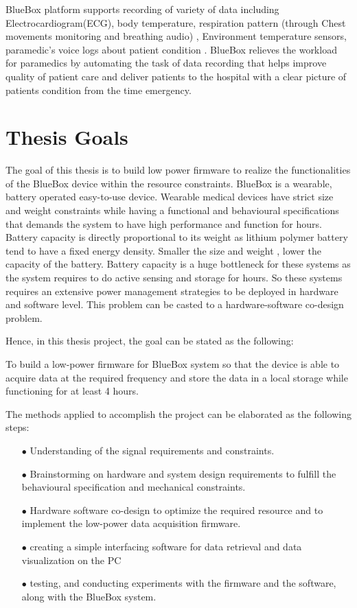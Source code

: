 \hspace{10mm}BlueBox  platform supports recording of variety of data including Electrocardiogram(ECG), body temperature, respiration pattern (through Chest movements monitoring and breathing audio) , Environment temperature sensors, paramedic’s voice logs about patient condition . BlueBox relieves the workload for paramedics by automating the task of data recording that helps improve quality of patient care and deliver patients to the hospital with a clear picture of patients condition from the time emergency. 

\section{Thesis Goals}
\hspace{10mm}The goal of this thesis is to build low power firmware to realize the functionalities of the BlueBox device within the resource constraints. BlueBox is a wearable, battery operated easy-to-use device. Wearable medical devices have strict size and weight constraints while having a functional and behavioural specifications that demands the system to have high performance and function for hours. Battery capacity is directly proportional to its weight as lithium polymer battery tend to have a fixed energy density. Smaller the size and weight , lower the capacity of the battery. Battery capacity is a huge bottleneck for these systems as the system requires to do active sensing and storage for hours. So these systems requires an extensive power management strategies to be deployed in hardware and software level. This problem can be casted to a hardware-software co-design problem.

Hence, in this thesis project, the goal can be stated as the following:

 \hspace{10mm}To build a low-power firmware for BlueBox system so that the device is able to acquire data at the required frequency and store the data in a local storage while functioning for at least 4 hours. 
 
 The methods applied to accomplish the project can be elaborated as the following steps:
 \begin{itemize}
 	\item[$\bullet$] Understanding of the signal requirements and constraints. 
 	
 	\item[$\bullet$] Brainstorming on hardware and system design requirements to fulfill the behavioural specification and  mechanical constraints.
 	
 	\item[$\bullet$] Hardware software co-design to optimize the required resource and to implement the low-power data acquisition firmware.
 	
 	\item[$\bullet$] creating a simple interfacing software for data retrieval and data visualization on the PC
 	
 	\item[$\bullet$] testing, and conducting experiments with the firmware and the software,
 	along with the BlueBox system.
 \end{itemize}
 
